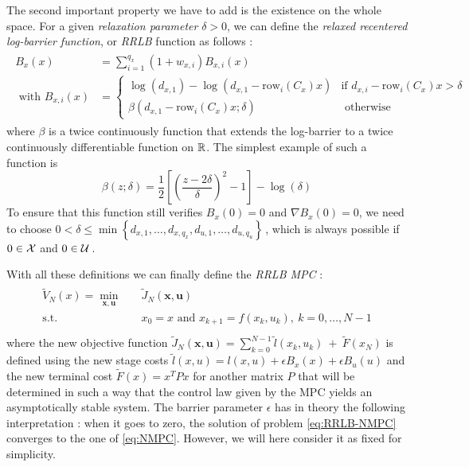 \documentclass[12pt]{article}
\begin{document}
The second important property we have to add is the existence on the whole space.
For a given \textit{relaxation parameter} $\delta>0$, we can define the \textit{relaxed recentered log-barrier function}, or \textit{RRLB} function as follows :
\begin{align}
	\begin{split}
		\label{RRLB}
		B_x(x)&=\sum_{i=1}^{q_x}(1+w_{x,i})B_{x,i}(x)\\
		\text{ with }B_{x,i}(x)&=\begin{cases}
			\log(d_{x,1})-\log(d_{x,1}-\mathrm{row}_i(C_x)x)&\text{if }d_{x,i}-\mathrm{row}_i(C_x)x>\delta\\
			\beta(d_{x,1}-\mathrm{row}_i(C_x)x;\delta)&\text{ otherwise}
		\end{cases}
	\end{split}
\end{align}
where $\beta$ is a twice continuously function that extends the log-barrier to a twice continuously differentiable function on $\R$.
The simplest example of such a function is 
$$\beta(z;\delta)=\frac{1}{2}\left[ \left( \frac{z-2\delta}{\delta} \right)^2-1 \right]-\log(\delta)$$
To ensure that this function still verifies $B_x(0)=0$ and $\nabla B_x(0)=0$, we need to choose $0<\delta\leq\min\left\{d_{x,1},\dots,d_{x,q_x},d_{u,1},\dots,d_{u,q_u}\right\}$\,, which is always possible if $0\in\cal{X}$ and $0\in\cal{U}$\,.

\vspace{24pt}

With all these definitions we can finally define the \textit{RRLB MPC} :
\begin{align}
	\begin{split}\label{eq:RRLB-NMPC}
		\tilde{V}_N(x)=\underset{\mathbf{x},\mathbf{u}}{\min} &\quad \tilde{J}_N(\mathbf{x},\mathbf{u})\\
		\text{s.t.} &\quad x_0=x\text{ and }x_{k+1}=f(x_k,u_k),~k=0,\dots,N-1\\
	\end{split}
\end{align}
where the new objective function $\tilde{J}_N(\mathbf{x},\mathbf{u})=\sum_{k=0}^{N-1}\tilde{l}(x_k,u_k)~+~\tilde{F}(x_N)$ is defined using the new stage costs $\tilde{l}(x,u)=l(x,u)+\epsilon B_x(x)+\epsilon B_u(u)$ and the new terminal cost $\tilde{F}(x)=x^TPx$ for another matrix $P$ that will be determined in such a way that the control law given by the MPC yields an asymptotically stable system.
The barrier parameter $\epsilon$ has in theory the following interpretation : when it goes to zero, the solution of problem \ref{eq:RRLB-NMPC} converges to the one of \ref{eq:NMPC}.
However, we will here consider it as fixed for simplicity.
\end{document}
